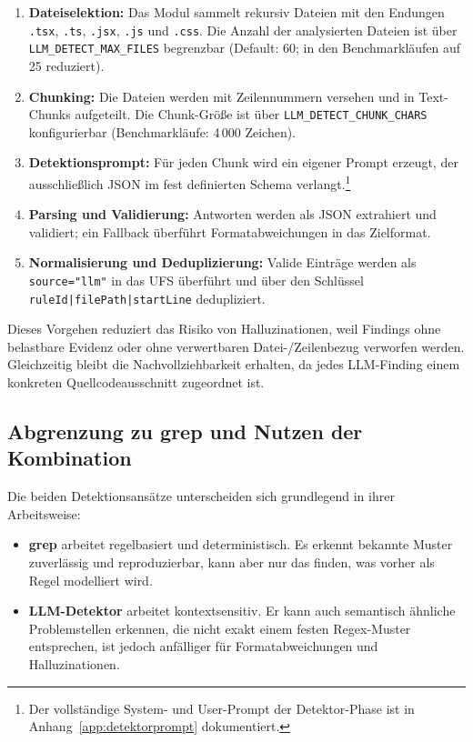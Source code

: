 \begin{enumerate}
  \item \textbf{Dateiselektion:} Das Modul sammelt rekursiv Dateien mit den Endungen \texttt{.tsx}, \texttt{.ts}, \texttt{.jsx}, \texttt{.js} und \texttt{.css}. Die Anzahl der analysierten Dateien ist über \texttt{LLM\_DETECT\_MAX\_FILES} begrenzbar (Default: 60; in den Benchmarkläufen auf 25 reduziert).
  \item \textbf{Chunking:} Die Dateien werden mit Zeilennummern versehen und in Text-Chunks aufgeteilt. Die Chunk-Größe ist über \texttt{LLM\_DETECT\_CHUNK\_CHARS} konfigurierbar (Benchmarkläufe: 4\,000 Zeichen).
  \item \textbf{Detektionsprompt:} Für jeden Chunk wird ein eigener Prompt erzeugt, der ausschließlich \acs{JSON} im fest definierten Schema verlangt.\footnote{Der vollständige System- und User-Prompt der Detektor-Phase ist in Anhang~\ref{app:detektorprompt} dokumentiert.}
  \item \textbf{Parsing und Validierung:} Antworten werden als \acs{JSON} extrahiert und validiert; ein Fallback überführt Formatabweichungen in das Zielformat.
  \item \textbf{Normalisierung und Deduplizierung:} Valide Einträge werden als \texttt{source="llm"} in das \ac{UFS} überführt und über den Schlüssel \texttt{ruleId|filePath|startLine} dedupliziert.
\end{enumerate}

Dieses Vorgehen reduziert das Risiko von Halluzinationen, weil Findings ohne belastbare Evidenz oder ohne verwertbaren Datei-/Zeilenbezug verworfen werden. Gleichzeitig bleibt die Nachvollziehbarkeit erhalten, da jedes \ac{LLM}-Finding einem konkreten Quellcodeausschnitt zugeordnet ist.

\subsection{Abgrenzung zu grep und Nutzen der Kombination}

Die beiden Detektionsansätze unterscheiden sich grundlegend in ihrer Arbeitsweise:

\begin{itemize}
  \item \textbf{grep} arbeitet regelbasiert und deterministisch. Es erkennt bekannte Muster zuverlässig und reproduzierbar, kann aber nur das finden, was vorher als Regel modelliert wird.
  \item \textbf{\acs{LLM}-Detektor} arbeitet kontextsensitiv. Er kann auch semantisch ähnliche \mbox{Problemstellen} erkennen, die nicht exakt einem festen Regex-Muster entsprechen, ist jedoch anfälliger für Formatabweichungen und Halluzinationen.
\end{itemize}

